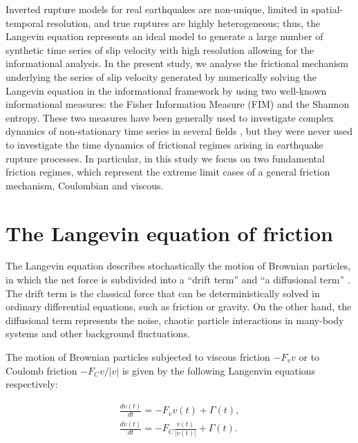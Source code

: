 \documentclass[%
 aip,
rsi,%
 amsmath,amssymb,
 reprint,%
]{revtex4-1}
\begin{document}
Inverted rupture models for real earthquakes are non-unique, limited in spatial-temporal resolution, and true ruptures are highly heterogeneous; thus, the Langevin equation represents an ideal model to generate a large number of synthetic time series of slip velocity with high resolution allowing for the informational analysis.
In the present study, we analyse the frictional mechanism underlying the series of slip velocity generated by numerically solving the Langevin equation in the informational framework by using two well-known informational measures: the Fisher Information Measure (FIM) and the Shannon entropy. These two measures have been generally used to investigate complex dynamics of non-stationary time series in several fields \cite{martin_fishers_1999,martin_fisher_2001,lovallo_complexity_2011,telesca_analysis_2011,telesca_analysis_2011-1,telesca_time-dependent_2010,telesca_nonlinear_2009}
, but they were never used to investigate the time dynamics of frictional regimes arising in earthquake rupture processes. In particular, in this study we focus on two fundamental friction regimes, which represent the extreme limit cases of a general friction mechanism, Coulombian and viscous.


\section{The Langevin equation of friction}
The Langevin equation describes stochastically the motion of Brownian particles, in which the net force is subdivided into a “drift term” and “a diffusional term” \cite{van_kampen_stochastic_1992,coffey_langevin_2012}. The drift term is the classical force that can be deterministically solved in ordinary differential equations, such as friction or gravity. On the other hand, the diffusional term represents the noise, chaotic particle interactions in many-body systems and other background fluctuations.

The motion of Brownian particles subjected to viscous friction $-F_v v$ or to Coulomb friction $-F_C v/|v|$ is given by the following Langenvin equations respectively:

\begin{eqnarray}
    \frac{dv(t)}{dt}=-F_v v(t)+\Gamma(t) \label{LE_V},
    \\
    \frac{dv(t)}{dt}=-F_C \frac{v(t)}{|v(t)|}+\Gamma(t) \label{LE_C}.
\end{eqnarray}
\end{document}
